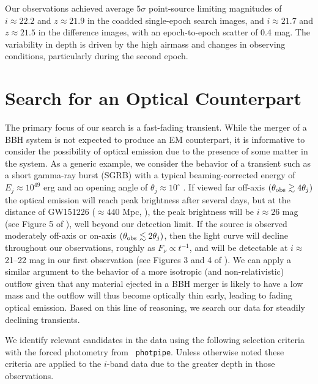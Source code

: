 Our observations achieved average $5\sigma$ point-source limiting
magnitudes of $i\approx22.2$ and $z\approx21.9$ in the coadded single-epoch
search images, and $i\approx21.7$ and $z\approx21.5$ in the difference
images, with an epoch-to-epoch scatter of 0.4 mag. The variability in 
depth is driven by the high airmass and
changes in observing conditions, particularly during the second epoch.

\section{Search for an Optical Counterpart}
\label{sec:analysis}

The primary focus of our search is a fast-fading transient. 
While the merger of a BBH system is not expected
to produce an EM counterpart, it is informative to consider the
possibility of optical emission due to the presence of some matter in
the system. As a generic example, we consider the behavior of a
transient such as a short gamma-ray burst (SGRB) with a typical beaming-corrected energy of
$E_j \approx 10^{49}$ erg and an opening angle of $\theta_j\approx
10^\circ$ \citep{berger14,fong+15}. If viewed far off-axis $(\theta_{\rm
  obs}\gtrsim 4\theta_j)$ the optical emission will reach peak
brightness after several days, but at the distance of GW151226
($\approx440$ Mpc, \citealt{abb+16c}), the peak brightness will be $i\approx 26$ mag (see Figure 5 of
\citealt{metzger12}), well beyond our detection limit. If the source
is observed moderately off-axis or on-axis $(\theta_{\rm obs} \lesssim
2\theta_j)$, then the light curve will decline throughout our
observations, roughly as $F_\nu\propto t^{-1}$, and will be detectable
at $i\approx$ 21--22 mag in our first observation (see Figures 3 and 4
of \citealt{metzger12}). We can apply a similar argument to the
behavior of a more isotropic (and non-relativistic) outflow given that
any material ejected in a BBH merger is likely to have a low mass and
the outflow will thus become optically thin early, leading to fading
optical emission. Based on this line of reasoning, we search our data
for steadily declining transients.

We identify relevant candidates in the data using the following
selection criteria with the forced photometry from {\tt
  photpipe}. Unless otherwise noted these criteria are applied to
  the $i$-band data due to the greater depth in those observations.

